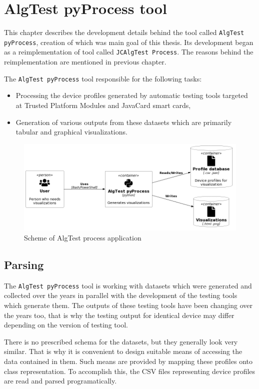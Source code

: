 \chapter{AlgTest pyProcess tool}
This chapter describes the development details behind the tool called \texttt{AlgTest pyProcess}, creation of which was main goal of this thesis. Its development began as a reimplementation of tool called \texttt{JCAlgTest Process}. The reasons behind the reimplementation are mentioned in previous chapter.

The \texttt{AlgTest pyProcess} tool responsible for the following tasks:
\begin{itemize}
    \item Processing the device profiles generated by automatic testing tools targeted at Trusted Platform Modules and JavaCard smart cards,
    \item Generation of various outputs from these datasets which are primarily tabular and graphical visualizations.
\end{itemize}
\begin{figure}[h]
    \centering
    \includegraphics[width=\textwidth]{img/scheme.png}
    \caption{Scheme of AlgTest process application}
    \label{fig:algtest-process-scheme}
\end{figure}


\section{Parsing}
The \texttt{AlgTest pyProcess} tool is working with datasets which were generated and collected over the years in parallel with the development of the testing tools which generate them. The outputs of these testing tools have been changing over the years too, that is why the testing output for identical device may differ depending on the version of testing tool.

There is no prescribed schema for the datasets, but they generally look very similar. That is why it is convenient to design suitable means of accessing the data contained in them. Such means are provided by mapping these profiles onto class representation. To accomplish this, the CSV files representing device profiles are read and parsed programatically.

